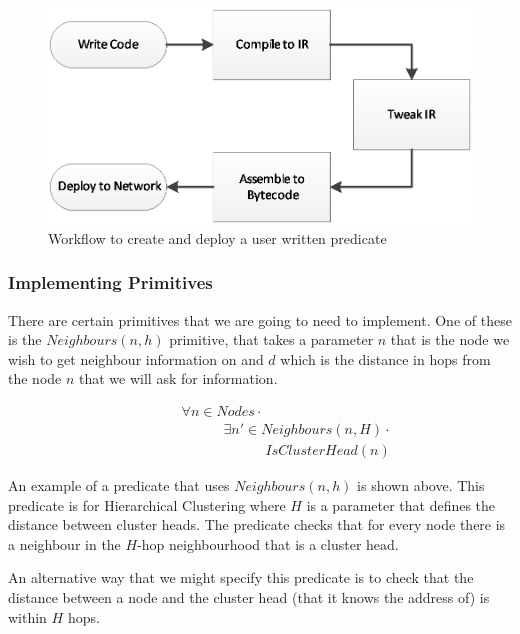 \begin{figure}[H]
\centering
\includegraphics{Diagrams/predicate-dev-process.eps}
\caption{Workflow to create and deploy a user written predicate}
\end{figure}




\subsubsection{Implementing Primitives}

There are certain primitives that we are going to need to implement. One of these is the $Neighbours(n, h)$ primitive, that takes a parameter $n$ that is the node we wish to get neighbour information on and $d$ which is the distance in hops from the node $n$ that we will ask for information.

\begin{align}
\label{eq:hcluster-neighbours-predicate}
& \hspace{3em}	\forall n \in Nodes \cdot \\
& \hspace{6em}		\exists n' \in Neighbours(n, H) \cdot \\
& \hspace{9em}			IsClusterHead(n)
\end{align}

An example of a predicate that uses $Neighbours(n, h)$ is shown above. This predicate is for Hierarchical Clustering where $H$ is a parameter that defines the distance between cluster heads. The predicate checks that for every node there is a neighbour in the $H$-hop neighbourhood that is a cluster head.

An alternative way that we might specify this predicate is to check that the distance between a node and the cluster head (that it knows the address of) is within $H$ hops.

